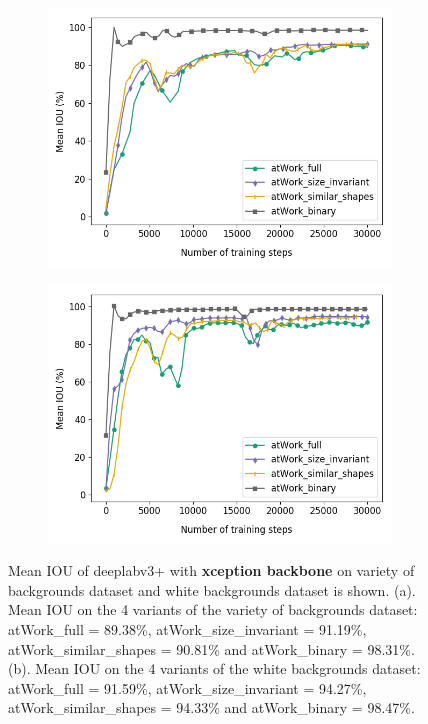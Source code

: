 	\begin{figure}
		\begin{subfigure}{.5\textwidth}
			\centering
			\includegraphics[width=1\linewidth]{images/xcep_4vars}
			\label{Fig:xcepvarsa}
			\caption{}
		\end{subfigure}
		\begin{subfigure}{.5\textwidth}
			\centering
			\includegraphics[width=1\linewidth]{images/xcep_4vars_white}
			\label{Fig:xcepvarsb}
			\caption{}
		\end{subfigure}
		\caption{Mean IOU of deeplabv3+ with \textbf{xception backbone} on variety of backgrounds dataset and white backgrounds dataset is shown. (a). Mean IOU on the 4 variants of the variety of backgrounds dataset: atWork\_full = 89.38\%, atWork\_size\_invariant = 91.19\%, atWork\_similar\_shapes = 90.81\% and atWork\_binary = 98.31\%. (b). Mean IOU on the 4 variants of the white backgrounds dataset: atWork\_full = 91.59\%, atWork\_size\_invariant = 94.27\%, atWork\_similar\_shapes = 94.33\% and atWork\_binary = 98.47\%.}
		\label{Fig:xcepvars}
	\end{figure}

